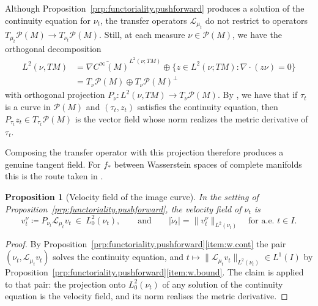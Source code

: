 \documentclass[11pt,reqno]{amsart}
\theoremstyle{plain}
\newtheorem{prp}[thm]{Proposition}
\theoremstyle{definition}
\newcommand{\Prob}{\mathcal{P}}
\newcommand{\Transf}{\mathcal{L}}
\begin{document}
Although Proposition~\ref{prp:functoriality.pushforward} produces a solution of the continuity equation for \(\nu_t\), the transfer operators \( \Transf_{\mu_t} \) do not restrict to operators \( T_{\mu_t}\Prob(M)\to T_{\nu_t}\Prob(M) \). 
Still, at each measure \( \nu\in \Prob(M) \), we have the orthogonal decomposition
\[
\begin{split}
    L^2(\nu,TM) &=\overline{\nabla C^\infty(M)}^{L^2(\nu; TM)}\oplus \{z\in L^2(\nu;TM): \nabla\!\cdot (z\nu)=0\} \\ 
                &= T_\nu \Prob(M) \oplus T_\nu \Prob(M)^\perp
\end{split}
\]
with orthogonal projection \( P_\nu:L^2(\nu, TM)\to T_\nu \Prob(M) \). 
By \cite[Proposition 1.30]{gigli_second_2012}, we have that if \( \tau_t \) is a curve in \( \Prob(M) \) and \( (\tau_t,z_t) \) satisfies the continuity equation, then \( P_{\tau_t}z_t\in T_{\tau_t}\Prob(M) \) is the vector field whose norm realizes the metric derivative of \( \tau_t \).

Composing the transfer operator with this projection therefore produces a genuine tangent field.
For \( f_\ast \) between Wasserstein spaces of complete manifolds this is the route taken in \cite[Corollary 3.13]{lessel_differentiable_2020}.

\begin{prp}[Velocity field of the image curve]\label{prp:image.velocity}
    In the setting of Proposition~\ref{prp:functoriality.pushforward}, the velocity field of \( \nu_t \) is
    \[
        v_t^\nu\coloneqq P_{\nu_t}\Transf_{\mu_t}v_t\ \in\ L^2_0(\nu_t),
        \qquad\text{and}\qquad
        \lvert\dot\nu_t\rvert=\big\lVert v_t^\nu\big\rVert_{L^2(\nu_t)}
        \quad\text{for a.e.\ }t\in I .
    \]
\end{prp}

\begin{proof}
    By Proposition~\ref{prp:functoriality.pushforward}\ref{item:w.cont} the pair \( (\nu_t,\Transf_{\mu_t}v_t) \) solves the continuity equation, and \( t\mapsto\lVert\Transf_{\mu_t}v_t\rVert_{L^2(\nu_t)}\in L^1(I) \) by Proposition~\ref{prp:functoriality.pushforward}\ref{item:w.bound}.
    The claim is \cite[Proposition~1.30]{gigli_second_2012} applied to that pair: the projection onto \( L^2_0(\nu_t) \) of any solution of the continuity equation is the velocity field, and its norm realises the metric derivative.
\end{proof}
\end{document}
